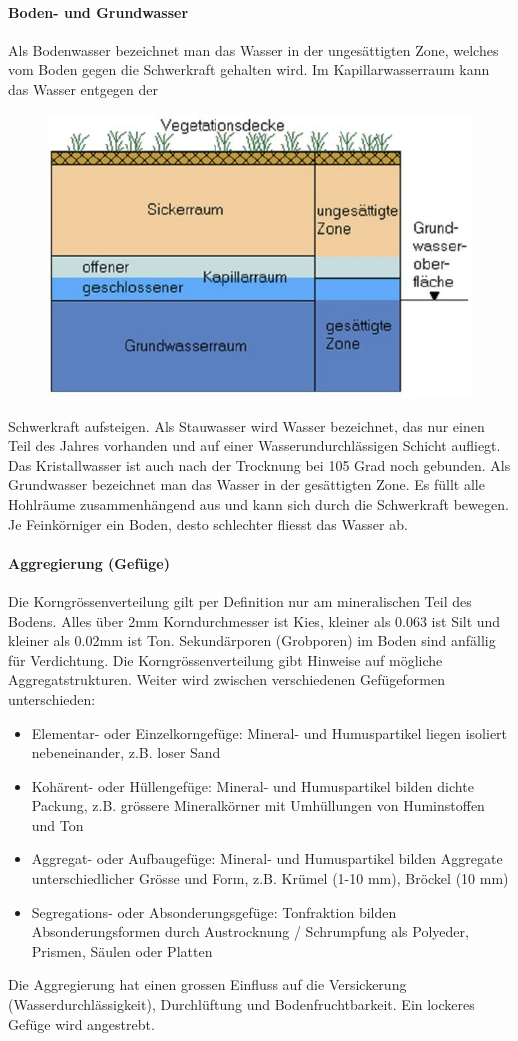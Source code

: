 \documentclass[9pt, openright=false]{scrartcl}
\begin{document}
\paragraph{Boden- und Grundwasser} Als Bodenwasser bezeichnet man das Wasser in der ungesättigten Zone, welches vom Boden gegen die Schwerkraft gehalten wird. Im Kapillarwasserraum kann das Wasser entgegen der\begin{figure} 
  \includegraphics[width=.45\textwidth]{images/bodenraum}
\end{figure} Schwerkraft aufsteigen. Als Stauwasser wird Wasser bezeichnet, das nur einen Teil des Jahres vorhanden und auf einer Wasserundurchlässigen Schicht aufliegt. Das Kristallwasser ist auch nach der Trocknung bei 105 Grad noch gebunden. Als Grundwasser bezeichnet man das Wasser in der gesättigten Zone. Es füllt alle Hohlräume zusammenhängend aus und kann sich durch die Schwerkraft bewegen. Je Feinkörniger ein Boden, desto schlechter fliesst das Wasser ab.
\paragraph{Aggregierung (Gefüge)} Die Korngrössenverteilung gilt per Definition nur am mineralischen Teil des Bodens. Alles über 2mm Korndurchmesser ist Kies, kleiner als 0.063 ist Silt und kleiner als 0.02mm ist Ton. Sekundärporen (Grobporen) im Boden sind anfällig für Verdichtung. Die Korngrössenverteilung gibt Hinweise auf mögliche Aggregatstrukturen. Weiter wird zwischen verschiedenen Gefügeformen unterschieden:
\begin{itemize}
\item Elementar- oder Einzelkorngefüge: Mineral- und Humuspartikel liegen isoliert nebeneinander, z.B. loser Sand
\item Kohärent- oder Hüllengefüge: Mineral- und Humuspartikel bilden dichte Packung, z.B. grössere Mineralkörner mit Umhüllungen von Huminstoffen und Ton
\item Aggregat- oder Aufbaugefüge: Mineral- und Humuspartikel bilden Aggregate unterschiedlicher Grösse und Form, z.B. Krümel (1-10 mm), Bröckel (10 mm)
\item Segregations- oder Absonderungsgefüge: Tonfraktion bilden Absonderungsformen durch Austrocknung / Schrumpfung als Polyeder, Prismen, Säulen oder Platten
\end{itemize}
Die Aggregierung hat einen grossen Einfluss auf die Versickerung (Wasserdurchlässigkeit), Durchlüftung und Bodenfruchtbarkeit. Ein lockeres Gefüge wird angestrebt.
\end{document}
